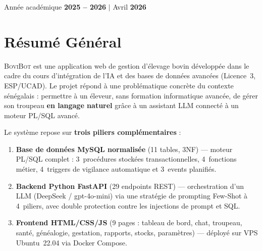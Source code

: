 \documentclass[12pt, a4paper, oneside]{report}
\newcommand{\bovibot}{\textsc{BoviBot}}
\begin{document}
\begin{titlepage}
  \vfill

  \begin{center}
    {\color{bovibrowndark}\normalsize
      Année académique \textbf{2025 – 2026}
      \quad\textcolor{bovibrown}{$\boldsymbol{\mid}$}\quad
      Avril \textbf{2026}}
  \end{center}

  \vspace{0.8cm}
\end{titlepage}

\setcounter{page}{1}

\tableofcontents
\newpage

{}
\chapter*{Résumé Général}

\begin{tcolorbox}[
  enhanced, breakable,
  colback=bovilight,
  colframe=bovibrown,
  arc=5pt, boxrule=0.8pt,
  left=14pt, right=14pt, top=10pt, bottom=10pt
]
\bovibot{} est une application web de gestion d'élevage bovin développée dans le cadre
du cours d'intégration de l'IA et des bases de données avancées (Licence~3, ESP/UCAD).
Le projet répond à une problématique concrète du contexte sénégalais : permettre à un
éleveur, sans formation informatique avancée, de gérer son troupeau \textbf{en langage
naturel} grâce à un assistant LLM connecté à un moteur PL/SQL avancé.
\end{tcolorbox}

\vspace{1em}

\noindent Le système repose sur \textbf{trois piliers complémentaires} :

\vspace{0.4em}

\begin{enumerate}[leftmargin=1.5cm, itemsep=6pt]
  \item \textbf{Base de données MySQL normalisée} (11 tables, 3NF) — moteur PL/SQL
    complet : 3~procédures stockées transactionnelles, 4~fonctions métier,
    4~triggers de vigilance automatique et 3~events planifiés.

  \item \textbf{Backend Python FastAPI} (29 endpoints REST) — orchestration d'un LLM
    (DeepSeek / gpt-4o-mini) via une stratégie de prompting Few-Shot à 4~piliers,
    avec double protection contre les injections de prompt et SQL.

  \item \textbf{Frontend HTML/CSS/JS} (9 pages : tableau de bord, chat, troupeau,
    santé, généalogie, gestation, rapports, stocks, paramètres) — déployé sur VPS
    Ubuntu~22.04 via Docker Compose.
\end{enumerate}
\end{document}
